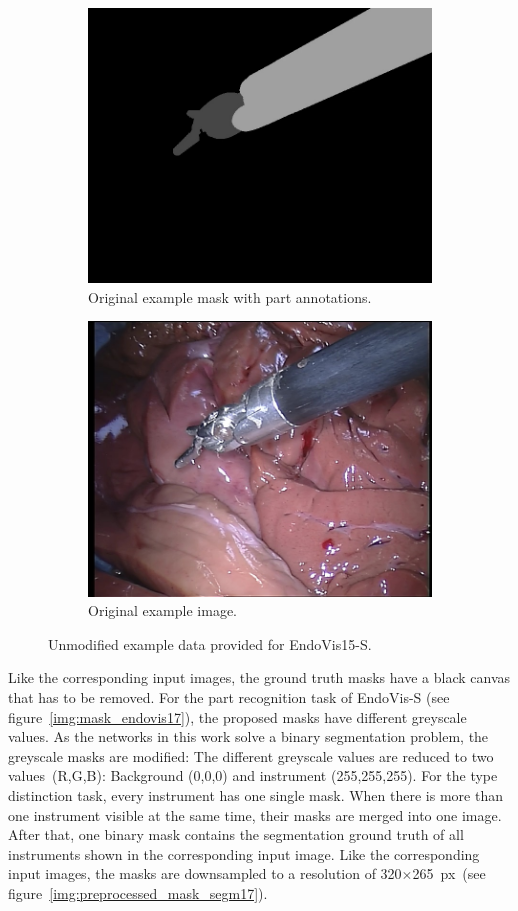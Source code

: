 \begin{figure}
\centering
\begin{subfigure}[t]{0.49\textwidth}
	\centering
	\includegraphics[width=.7\textwidth]{images/dataset/robotic15_segm/mask_original_dataset2_frame0.jpg}
	\caption{Original example mask with part annotations.}
	\label{img:orig_frame_endovis15}
\end{subfigure}
\begin{subfigure}[t]{0.49\textwidth}
	\centering
	\includegraphics[width=.7\textwidth]{images/dataset/robotic15_segm/img_original_dataset2_frame0.jpg}
	\caption{Original example image.}
	\label{img:orig_mask_endovis15}
\end{subfigure}
\caption[Example data EndoVis15-S]{Unmodified example data provided for EndoVis15-S.}
\label{img:endovis15seg_orig_mask_image}
\end{figure}

Like the corresponding input images, the ground truth masks have a black canvas that has to be removed.
For the part recognition task of EndoVis-S (see figure~\ref{img:mask_endovis17}), the proposed masks have different greyscale values. As the networks in this work solve a binary segmentation problem, the greyscale masks are modified: The different greyscale values are reduced to two values~(R,G,B): Background (0,0,0) and instrument (255,255,255). For the type distinction task, every instrument has one single mask. When there is more than one instrument visible at the same time, their masks are merged into one image. 
After that, one binary mask contains the segmentation ground truth of all instruments shown in the corresponding input image. Like the corresponding input images, the masks are downsampled to a resolution of 320$\times$265~px~(see figure~\ref{img:preprocessed_mask_segm17}).

